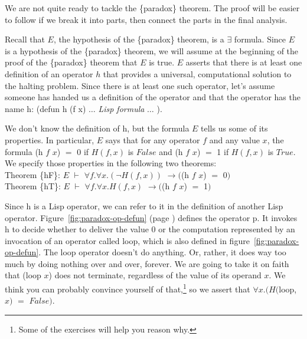 We are not quite ready to tackle the \{paradox\} theorem.
The proof will be easier to follow if we break it into parts,
then connect the parts in the final analysis.

Recall that $E$, the hypothesis of the \{paradox\} theorem,
is a $\exists$ formula.
Since $E$ is a hypothesis of the \{paradox\} theorem,
we will assume at the beginning of the proof
of the \{paradox\} theorem that $E$ is true.
$E$ asserts that there is at least one definition of
an operator $h$ that provides a universal, computational solution
to the halting problem.
Since there is at least one such operator,
let's assume someone has handed us a
definition of the operator and that the operator has the name \textsf{h}:
\textsf{(defun h (f x)}  $\dots$ \emph{Lisp formula} $\dots$ \textsf{)}.

We don't know the definition of \textsf{h}, but the formula $E$
tells us some of its properties.
In particular, $E$ says that for any operator $f$ and any value $x$,
the formula \textsf{(h $f$ $x$)} $=$ \textsf{0} if $H(f, x)$ is $False$ and
\textsf{(h $f$ $x$)} $=$ \textsf{1} if $H(f,x)$ is $True$.
We specify those properties in the following two theorems:
\vspace{2mm}\\
\hspace*{5mm}Theorem \{hF\}: $E$ $\vdash$ $\forall f.\forall x.(\neg H(f, x))$ $\rightarrow ($\textsf{(h $f$ $x$)} $=$ \textsf{0}$)$\\
\hspace*{5mm}Theorem \{hT\}: $E$ $\vdash$ $\forall f.\forall x.H(f, x)$      $\rightarrow ($\textsf{(h $f$ $x$)} $=$ \textsf{1}$)$
\vspace{2mm}

Since \textsf{h} is a Lisp operator, we can refer to it in the definition of
another Lisp operator.
Figure~\ref{fig:paradox-op-defun} (page \pageref{fig:paradox-op-defun})
defines the operator \textsf{p}.
It invokes \textsf{h} to decide whether to deliver the value \textsf{0} or
the computation represented by an invocation of an operator called \textsf{loop},
which is also defined in
figure~\ref{fig:paradox-op-defun}.
The \textsf{loop} operator doesn't do anything. %
Or, rather,
it does way too much by doing nothing over and over, forever.
We are going to take it on faith that \textsf{(loop $x$)} does not terminate,
regardless of the value of its operand $x$.
We think you can probably convince yourself of that,\footnote{Some
of the exercises will help you reason why.}
so we assert that $\forall x.(H($\textsf{loop}, $x)$ $=$ $False)$.

